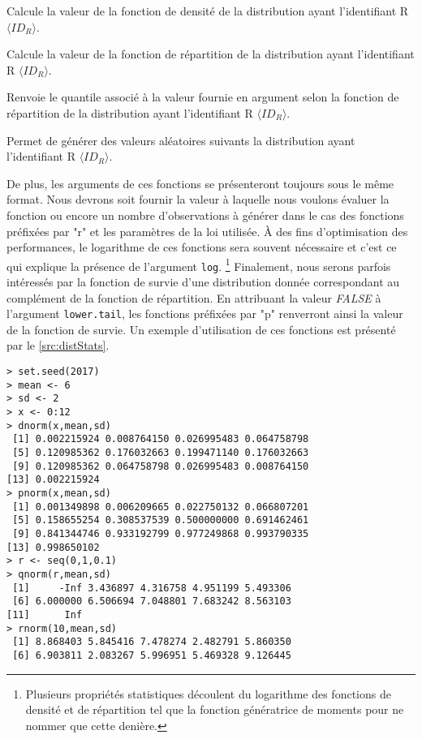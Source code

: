\begin{description}[style=multiline,leftmargin=2cm]
	\item[$d\langle ID_R \rangle$] Calcule la valeur de la fonction de densité de la distribution ayant l'identifiant R $\langle ID_R \rangle$.
	\item[$p\langle ID_R \rangle$] Calcule la valeur de la fonction de répartition de la distribution ayant l'identifiant R $\langle ID_R \rangle$.
	\item[$q\langle ID_R \rangle$] Renvoie le quantile associé à la valeur fournie en argument selon  la fonction de répartition de la distribution ayant l'identifiant R $\langle ID_R \rangle$.
	\item[$r\langle ID_R \rangle$] Permet de générer des valeurs aléatoires suivants la distribution ayant l'identifiant R $\langle ID_R \rangle$.
\end{description}

De plus, les arguments de ces fonctions se présenteront toujours sous le même format. Nous devrons soit fournir la valeur à laquelle nous voulons évaluer la fonction ou encore un nombre d'observations à générer dans le cas des fonctions préfixées par "r" et les paramètres de la loi utilisée. À des fins d'optimisation des performances, le logarithme de ces fonctions sera souvent nécessaire et c'est ce qui explique la présence de l'argument \texttt{log}. \footnote{Plusieurs propriétés statistiques découlent du logarithme des fonctions de densité et de répartition tel que la fonction génératrice de moments pour ne nommer que cette denière.} Finalement, nous serons parfois intéressés par la fonction de survie d'une distribution donnée correspondant au complément de la fonction de répartition. En attribuant la valeur \textit{FALSE} à l'argument \texttt{lower.tail}, les fonctions préfixées par "p" renverront ainsi la valeur de la fonction de survie. Un exemple d'utilisation de ces fonctions est présenté par le \autoref{src:distStats}. \\

\begin{lstlisting}[caption = Fonctions relatives à la distribution Normale,label=src:distStats]
> set.seed(2017)
> mean <- 6
> sd <- 2
> x <- 0:12
> dnorm(x,mean,sd)
 [1] 0.002215924 0.008764150 0.026995483 0.064758798
 [5] 0.120985362 0.176032663 0.199471140 0.176032663
 [9] 0.120985362 0.064758798 0.026995483 0.008764150
[13] 0.002215924
> pnorm(x,mean,sd)
 [1] 0.001349898 0.006209665 0.022750132 0.066807201
 [5] 0.158655254 0.308537539 0.500000000 0.691462461
 [9] 0.841344746 0.933192799 0.977249868 0.993790335
[13] 0.998650102
> r <- seq(0,1,0.1)
> qnorm(r,mean,sd)
 [1]     -Inf 3.436897 4.316758 4.951199 5.493306
 [6] 6.000000 6.506694 7.048801 7.683242 8.563103
[11]      Inf
> rnorm(10,mean,sd)
 [1] 8.868403 5.845416 7.478274 2.482791 5.860350
 [6] 6.903811 2.083267 5.996951 5.469328 9.126445
\end{lstlisting}

